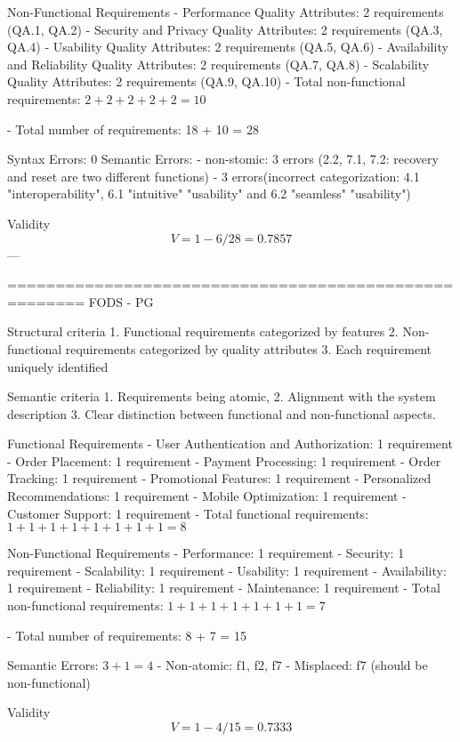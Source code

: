 Non-Functional Requirements
- Performance Quality Attributes: 2 requirements (QA.1, QA.2)
- Security and Privacy Quality Attributes: 2 requirements (QA.3, QA.4)
- Usability Quality Attributes: 2 requirements (QA.5, QA.6)
- Availability and Reliability Quality Attributes: 2 requirements (QA.7, QA.8)
- Scalability Quality Attributes: 2 requirements (QA.9, QA.10)
- Total non-functional requirements: \( 2 + 2 + 2 + 2 + 2 = 10 \)

- Total number of requirements: 18 + 10 = 28

Syntax Errors: 0 
Semantic Errors:
- non-stomic: 3 errors (2.2, 7.1, 7.2: recovery and reset are two different functions)  
- 3 errors(incorrect categorization: 4.1 "interoperability", 6.1 "intuitive" "usability" and 6.2 "seamless" "usability")

Validity
\[
V = 1 - 6/28 = 0.7857
\]
---

======================================================
FODS - PG

Structural criteria 
1. Functional requirements categorized by features
2. Non-functional requirements categorized by quality attributes
3. Each requirement uniquely identified

Semantic criteria
1. Requirements being atomic, 
2. Alignment with the system description
3. Clear distinction between functional and non-functional aspects. 

Functional Requirements
- User Authentication and Authorization: 1 requirement
- Order Placement: 1 requirement
- Payment Processing: 1 requirement
- Order Tracking: 1 requirement
- Promotional Features: 1 requirement
- Personalized Recommendations: 1 requirement
- Mobile Optimization: 1 requirement
- Customer Support: 1 requirement
- Total functional requirements: \( 1 + 1 + 1 + 1 + 1 + 1 + 1 + 1 = 8 \)

Non-Functional Requirements
- Performance: 1 requirement
- Security: 1 requirement
- Scalability: 1 requirement
- Usability: 1 requirement
- Availability: 1 requirement
- Reliability: 1 requirement
- Maintenance: 1 requirement
- Total non-functional requirements: \( 1 + 1 + 1 + 1 + 1 + 1 + 1 = 7 \)

- Total number of requirements: 8 + 7 = 15

Semantic Errors: \( 3 + 1 = 4 \)
- Non-atomic: f1, f2, f7
- Misplaced: f7 (should be non-functional)

Validity
\[
V = 1 - 4/15 = 0.7333
\]
